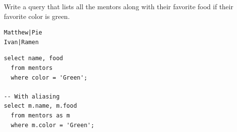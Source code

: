 \begin{blocksection}
Write a query that lists all the mentors along with their favorite food if their favorite color is green.

\begin{lstlisting}
Matthew|Pie
Ivan|Ramen
\end{lstlisting}

\begin{solution}[1in]
\begin{lstlisting}
select name, food
  from mentors
  where color = 'Green';
  
-- With aliasing
select m.name, m.food
  from mentors as m
  where m.color = 'Green';
\end{lstlisting}
\end{solution}
\end{blocksection}
